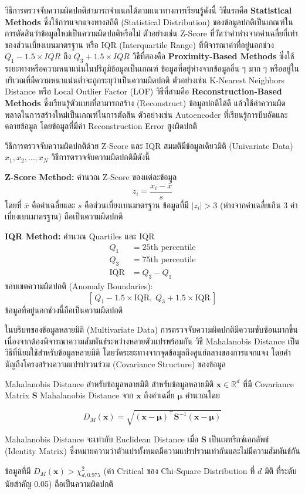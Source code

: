 วิธีการตรวจจับความผิดปกติสามารถจำแนกได้ตามแนวทางการเรียนรู้ดังนี้ วิธีแรกคือ \textbf{Statistical Methods} ซึ่งใช้การแจกแจงทางสถิติ (Statistical Distribution) ของข้อมูลปกติเป็นเกณฑ์ในการตัดสินว่าข้อมูลใหม่เป็นความผิดปกติหรือไม่ ตัวอย่างเช่น Z-Score ที่วัดว่าค่าห่างจากค่าเฉลี่ยกี่เท่าของส่วนเบี่ยงเบนมาตรฐาน หรือ IQR (Interquartile Range) ที่พิจารณาค่าที่อยู่นอกช่วง $Q_1 - 1.5 \times IQR$ ถึง $Q_3 + 1.5 \times IQR$ วิธีที่สองคือ \textbf{Proximity-Based Methods} ซึ่งใช้ระยะทางหรือความหนาแน่นในปริภูมิข้อมูลเป็นเกณฑ์ ข้อมูลที่อยู่ห่างจากข้อมูลอื่น ๆ มาก ๆ หรืออยู่ในบริเวณที่มีความหนาแน่นต่ำจะถูกระบุว่าเป็นความผิดปกติ ตัวอย่างเช่น K-Nearest Neighbors Distance หรือ Local Outlier Factor (LOF) วิธีที่สามคือ \textbf{Reconstruction-Based Methods} ซึ่งเรียนรู้ตัวแบบที่สามารถสร้าง (Reconstruct) ข้อมูลปกติได้ดี แล้วใช้ค่าความผิดพลาดในการสร้างใหม่เป็นเกณฑ์ในการตัดสิน ตัวอย่างเช่น Autoencoder ที่เรียนรู้การบีบอัดและคลายข้อมูล โดยข้อมูลที่มีค่า Reconstruction Error สูงผิดปกติ

\begin{myBox}[]{วิธีการตรวจจับความผิดปกติด้วย Z-Score และ IQR}{}
สมมติมีข้อมูลเดียวมิติ (Univariate Data) $x_1, x_2, \ldots, x_N$ วิธีการตรวจจับความผิดปกติมีดังนี้

\textbf{Z-Score Method:} คำนวณ Z-Score ของแต่ละข้อมูล
$$z_i = \frac{x_i - \bar{x}}{s}$$
โดยที่ $\bar{x}$ คือค่าเฉลี่ยและ $s$ คือส่วนเบี่ยงเบนมาตรฐาน ข้อมูลที่มี $|z_i| > 3$ (ห่างจากค่าเฉลี่ยเกิน 3 ค่าเบี่ยงเบนมาตรฐาน) ถือเป็นความผิดปกติ

\textbf{IQR Method:} คำนวณ Quartiles และ IQR
\begin{align*}
Q_1 &= 25\text{th percentile} \\
Q_3 &= 75\text{th percentile} \\
\text{IQR} &= Q_3 - Q_1
\end{align*}
ขอบเขตความผิดปกติ (Anomaly Boundaries):
$$[\,Q_1 - 1.5 \times \text{IQR},\; Q_3 + 1.5 \times \text{IQR}\,]$$
ข้อมูลที่อยู่นอกช่วงนี้ถือเป็นความผิดปกติ
\end{myBox}

ในบริบทของข้อมูลหลายมิติ (Multivariate Data) การตรวจจับความผิดปกติมีความซับซ้อนมากขึ้น เนื่องจากต้องพิจารณาความสัมพันธ์ระหว่างหลายตัวแปรพร้อมกัน วิธี Mahalanobis Distance เป็นวิธีที่นิยมใช้สำหรับข้อมูลหลายมิติ โดยวัดระยะทางจากจุดข้อมูลถึงศูนย์กลางของการแจกแจง โดยคำนัญถึงโครงสร้างความแปรปรวนร่วม (Covariance Structure) ของข้อมูล

\begin{myBox}[]{Mahalanobis Distance สำหรับข้อมูลหลายมิติ}{}
สำหรับข้อมูลหลายมิติ $\mathbf{x} \in \mathbb{R}^d$ ที่มี Covariance Matrix $\mathbf{S}$ Mahalanobis Distance จาก $\mathbf{x}$ ถึงค่าเฉลี่ย $\boldsymbol{\mu}$ คำนวณโดย

$$D_M(\mathbf{x}) = \sqrt{(\mathbf{x} - \boldsymbol{\mu})^\top \mathbf{S}^{-1} (\mathbf{x} - \boldsymbol{\mu})}$$

Mahalanobis Distance จะเท่ากับ Euclidean Distance เมื่อ $\mathbf{S}$ เป็นเมทริกซ์เอกลัพธ์ (Identity Matrix) ซึ่งหมายความว่าตัวแปรทั้งหมดมีความแปรปรวนเท่ากันและไม่มีความสัมพันธ์กัน

ข้อมูลที่มี $D_M(\mathbf{x}) > \chi^2_{d, 0.975}$ (ค่า Critical ของ Chi-Square Distribution ที่ $d$ มิติ ที่ระดับนัยสำคัญ 0.05) ถือเป็นความผิดปกติ
\end{myBox}

